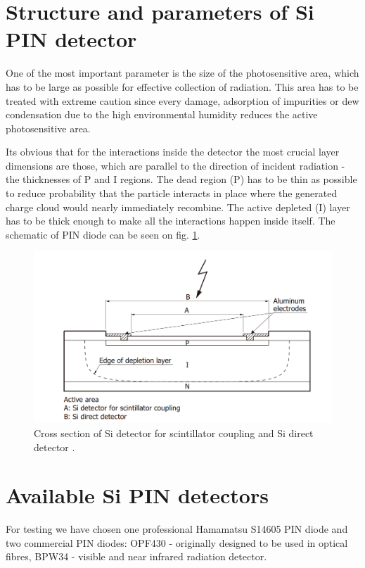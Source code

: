 \section{Structure and parameters of Si PIN detector}
One of the most important parameter is the size of the photosensitive area, which has to be large as possible for effective collection of radiation. This area has to be treated with extreme caution since every damage, adsorption of impurities or dew condensation due to the high environmental humidity reduces the active photosensitive area.

\par
Its obvious that for the interactions inside the detector the most crucial layer dimensions are those, which are parallel to the direction of incident radiation - the thicknesses of P and I regions.
The dead region (P) has to be thin as possible to reduce probability that the particle interacts in place where the generated charge cloud would nearly immediately recombine. The active depleted (I) layer has to be thick enough to make all the interactions happen inside itself. The schematic of PIN diode can be seen on fig. \ref{SiPIN}.


\begin{figure}[H]
 \centering
 \includegraphics[scale=0.35, angle = 0]{./pictures/SiPINScheme.png}
 \caption{Cross section of Si detector for scintillator coupling and Si direct detector \cite{SiPINdirect}.}
 \label{SiPIN}
 
\end{figure}



\section{Available Si PIN detectors}
For testing we have chosen one professional Hamamatsu S14605 PIN diode and two commercial PIN diodes: OPF430 - originally designed to be used in optical fibres, BPW34 - visible and near infrared radiation detector.  

